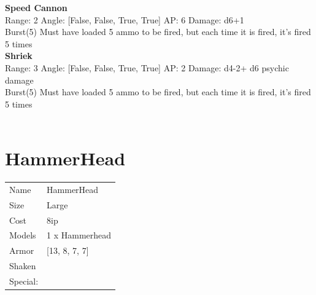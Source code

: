 {\bf Speed Cannon } \\



Range: 2  Angle: [False, False, True, True] AP: 6 Damage: d6+1 \\
Burst(5) Must have loaded 5 ammo to be fired, but each time it is fired, it's fired 5 times\\ 




{\bf Shriek } \\



Range: 3  Angle: [False, False, True, True] AP: 2 Damage: d4-2+ d6 psychic damage \\
Burst(5) Must have loaded 5 ammo to be fired, but each time it is fired, it's fired 5 times\\ 




 
\ \\













\clearpage

\section{ HammerHead }

\begin{tabular}{ll}
  Name & HammerHead \\
  Size & Large\\
  Cost & 8ip\\
  Models & 1 x Hammerhead\\
  Armor & [13, 8, 7, 7]\\
  Shaken & \\
  Special: \\
\end{tabular}

\noindent 

